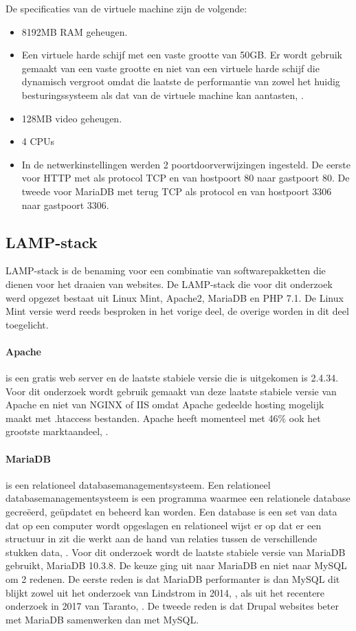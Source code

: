 De specificaties van de virtuele machine zijn de volgende:
\begin{itemize}
\item 8192MB \gls{RAM} geheugen.
\item Een virtuele harde schijf met een vaste grootte van 50GB. Er wordt gebruik gemaakt van een vaste grootte en niet van een virtuele harde schijf die dynamisch vergroot omdat die laatste de performantie van zowel het huidig besturingssysteem als dat van de virtuele machine kan aantasten, \textcite{Sanders2006}.
\item 128MB video geheugen.
\item 4 \glspl{CPU}
\item In de netwerkinstellingen werden 2 poortdoorverwijzingen ingesteld. De eerste voor \gls{HTTP} met als protocol \gls{TCP} en van hostpoort 80 naar gastpoort 80. De tweede voor MariaDB met terug \gls{TCP} als protocol en van hostpoort 3306 naar gastpoort 3306.
\end{itemize}

\subsection{LAMP-stack}

LAMP-stack is de benaming voor een combinatie van softwarepakketten die dienen voor het draaien van websites. De LAMP-stack die voor dit onderzoek werd opgezet bestaat uit Linux Mint, Apache2, MariaDB en PHP 7.1. De Linux Mint versie werd reeds besproken in het vorige deel, de overige worden in dit deel toegelicht.

\paragraph{Apache}
\textcite{Apache} is een gratis \gls{web server} en de laatste stabiele versie die is uitgekomen is 2.4.34. Voor dit onderzoek wordt gebruik gemaakt van deze laatste stabiele versie van Apache en niet van NGINX of IIS omdat Apache gedeelde hosting mogelijk maakt met .htaccess bestanden. Apache heeft momenteel met 46\% ook het grootste marktaandeel, \autocite{Leslie2018}.

\paragraph{MariaDB}
\textcite{MariaDB} is een relationeel databasemanagementsysteem. Een relationeel databasemanagementsysteem is een programma waarmee een relationele database gecreëerd, geüpdatet en beheerd kan worden. Een database is een set van data dat op een computer wordt opgeslagen en relationeel wijst er op dat er een structuur in zit die werkt aan de hand van relaties tussen de verschillende stukken data, \autocite{RDBMS}. Voor dit onderzoek wordt de laatste stabiele versie van MariaDB gebruikt, MariaDB 10.3.8. De keuze ging uit naar MariaDB en niet naar MySQL om 2 redenen. De eerste reden is dat MariaDB performanter is dan MySQL dit blijkt zowel uit het onderzoek van Lindstrom in 2014, \autocite{Lindstrom2014}, als uit het recentere onderzoek in 2017 van Taranto, \autocite{Taranto2017}. De tweede reden is dat Drupal websites beter met MariaDB samenwerken dan met MySQL.

